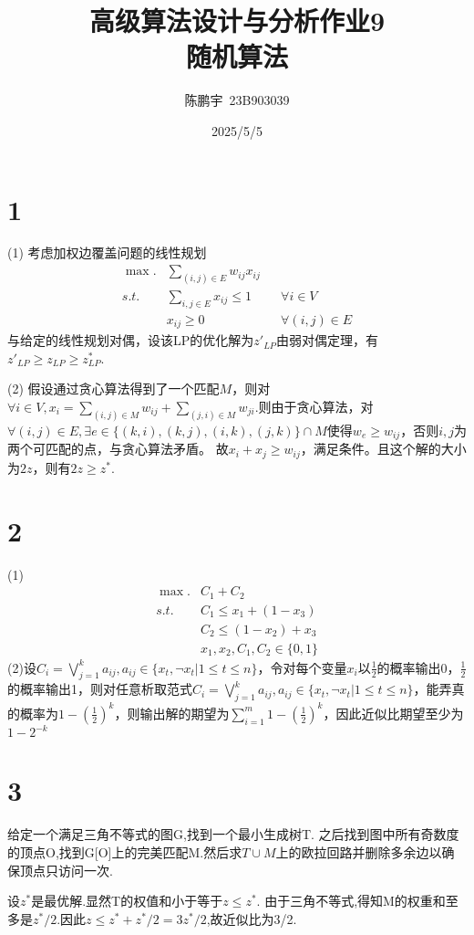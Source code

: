 \documentclass{ctexart}
\title{高级算法设计与分析作业9\\随机算法}
\author{陈鹏宇\ 23B903039}
\date{2025/5/5}
\begin{document}
\maketitle


\section*{1}
(1) 
考虑加权边覆盖问题的线性规划
$$
\begin{aligned}
\max.& \sum_{(i,j)\in E}w_{ij}x_{ij}\\
s.t.& \sum_{i,j\in E}x_{ij}\le 1 && \forall i\in V\\
&x_{ij}\ge 0 && \forall (i,j)\in E
\end{aligned}
$$
与给定的线性规划对偶，设该LP的优化解为$z'_{LP}$由弱对偶定理，有$z'_{LP}\ge z_{LP}\ge z^*_{LP}$.

(2)
假设通过贪心算法得到了一个匹配$M$，则对$\forall i\in V, x_i=\sum_{(i,j)\in M}w_{ij}+\sum_{(j,i)\in M}w_{ji}$.则由于贪心算法，对$\forall(i,j)\in E, \exists e\in \{(k,i),(k,j),(i,k),(j,k)\}\cap M$使得$w_{e}\ge w_{ij}$，否则$i,j$为两个可匹配的点，与贪心算法矛盾。 故$x_i+x_j\ge w_{ij}$，满足条件。且这个解的大小为$2z$，则有$2z\ge z^*$.

\section*{2}
(1) 
$$
\begin{aligned}
\max.& C_1 + C_2\\
s.t.& C_1 \le x_1 + (1-x_3)\\
& C_2 \le (1-x_2) + x_3\\
& x_1,x_2,C_1,C_2\in\{0,1\}
\end{aligned}
$$
(2)设$C_i=\bigvee_{j=1}^{k}a_{ij},a_{ij}\in\{x_t,\neg x_t|1\le t\le n\}$，令对每个变量$x_i$以$\frac{1}{2}$的概率输出0，$\frac{1}{2}$的概率输出1，则对任意析取范式$C_i=\bigvee_{j=1}^{k}a_{ij},a_{ij}\in\{x_t,\neg x_t|1\le t\le n\}$，能弄真的概率为$1-(\frac{1}{2})^k$，则输出解的期望为$\sum_{i=1}^{m}1-(\frac{1}{2})^k$，因此近似比期望至少为$1-2^{-k}$

\section*{3}

给定一个满足三角不等式的图G,找到一个最小生成树T. 之后找到图中所有奇数度的顶点O,找到G[O]上的完美匹配M.然后求$T\cup M$上的欧拉回路并删除多余边以确保顶点只访问一次.

设$z^*$是最优解.显然T的权值和小于等于$z\le z^*$. 由于三角不等式,得知M的权重和至多是$z^*/2$.因此$z\le z^* + z^*/2 = 3z^*/2$,故近似比为3/2.
\end{document}
